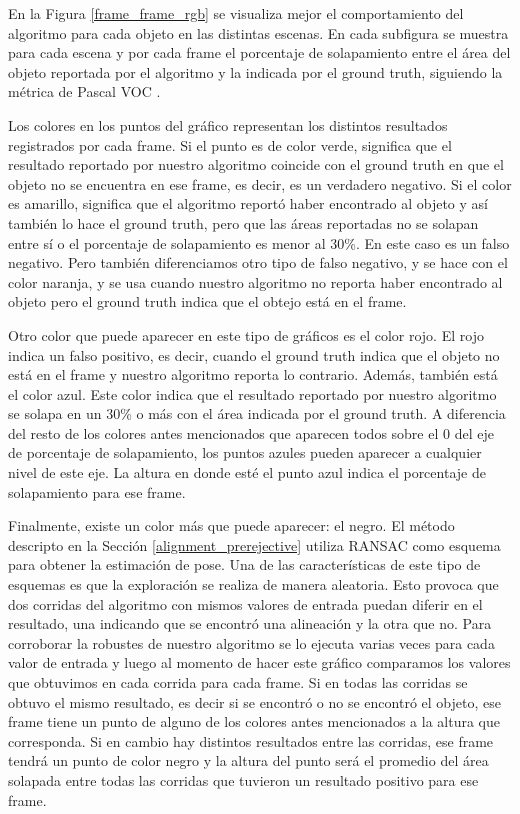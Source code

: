En la Figura \ref{frame_frame_rgb} se visualiza mejor el comportamiento del algoritmo para cada objeto en las distintas escenas. En cada subfigura se muestra para cada escena y por cada frame el porcentaje de solapamiento entre el área del objeto reportada por el algoritmo y la indicada por el ground truth, siguiendo la métrica de Pascal VOC \cite{everinghampascal}.

Los colores en los puntos del gráfico representan los distintos resultados registrados por cada frame. Si el punto es de color verde, significa que el resultado reportado por nuestro algoritmo coincide con el ground truth en que el objeto no se encuentra en ese frame, es decir, es un verdadero negativo. Si el color es amarillo, significa que el algoritmo reportó haber encontrado al objeto y así también lo hace el ground truth, pero que las áreas reportadas no se solapan entre sí o el porcentaje de solapamiento es menor al 30\%. En este caso es un falso negativo. Pero también diferenciamos otro tipo de falso negativo, y se hace con el color naranja, y se usa cuando nuestro algoritmo no reporta haber encontrado al objeto pero el ground truth indica que el obtejo está en el frame.

Otro color que puede aparecer en este tipo de gráficos es el color rojo. El rojo indica un falso positivo, es decir, cuando el ground truth indica que el objeto no está en el frame y nuestro algoritmo reporta lo contrario. Además, también está el color azul. Este color indica que el resultado reportado por nuestro algoritmo se solapa en un 30\% o más con el área indicada por el ground truth. A diferencia del resto de los colores antes mencionados que aparecen todos sobre el 0 del eje de porcentaje de solapamiento, los puntos azules pueden aparecer a cualquier nivel de este eje. La altura en donde esté el punto azul indica el porcentaje de solapamiento para ese frame.

Finalmente, existe un color más que puede aparecer: el negro. El método descripto en la Sección \ref{alignment_prerejective} utiliza RANSAC como esquema para obtener la estimación de pose. Una de las características de este tipo de esquemas es que la exploración se realiza de manera aleatoria. Esto provoca que dos corridas del algoritmo con mismos valores de entrada puedan diferir en el resultado, una indicando que se encontró una alineación y la otra que no. Para corroborar la robustes de nuestro algoritmo se lo ejecuta varias veces para cada valor de entrada y luego al momento de hacer este gráfico comparamos los valores que obtuvimos en cada corrida para cada frame. Si en todas las corridas se obtuvo el mismo resultado, es decir si se encontró o no se encontró el objeto, ese frame tiene un punto de alguno de los colores antes mencionados a la altura que corresponda. Si en cambio hay distintos resultados entre las corridas, ese frame tendrá un punto de color negro y la altura del punto será el promedio del área solapada entre todas las corridas que tuvieron un resultado positivo para ese frame.


